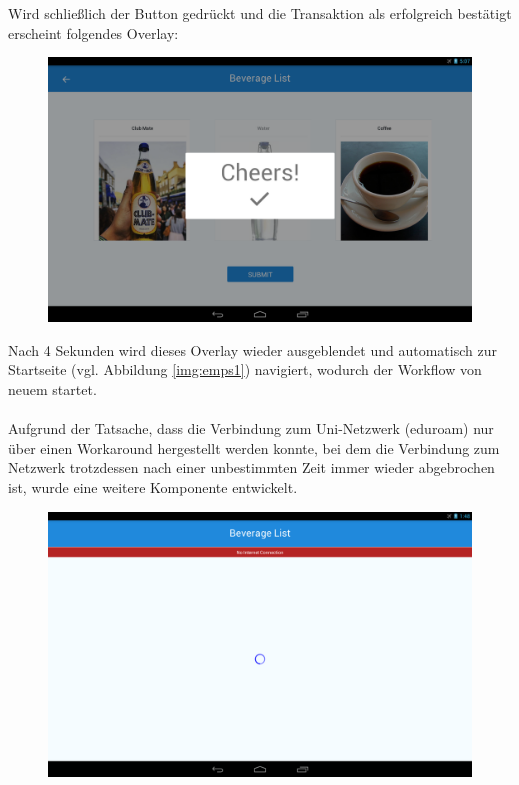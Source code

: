 Wird schließlich der  Button gedrückt und die Transaktion als erfolgreich bestätigt erscheint folgendes Overlay:

\begin{figure}[th!]
	\centering
	\includegraphics[width=.9\columnwidth]{./Abbildungen/Kapitel_03/cheers.png}
	\caption{}
	\label{img:drinks2}
\end{figure}

Nach 4 Sekunden wird dieses Overlay wieder ausgeblendet und automatisch zur Startseite (vgl. Abbildung \ref{img:emps1}) navigiert, wodurch der Workflow von neuem startet.\\\\
Aufgrund der Tatsache, dass die Verbindung zum Uni-Netzwerk (eduroam) nur über einen Workaround hergestellt werden konnte, bei dem die Verbindung zum Netzwerk trotzdessen nach einer unbestimmten Zeit immer wieder abgebrochen ist, wurde eine weitere Komponente entwickelt.

\begin{figure}[th!]
	\centering
	\includegraphics[width=.9\columnwidth]{./Abbildungen/Kapitel_03/noconnection.png}
	\caption{}
	\label{img:drinks2}
\end{figure}

